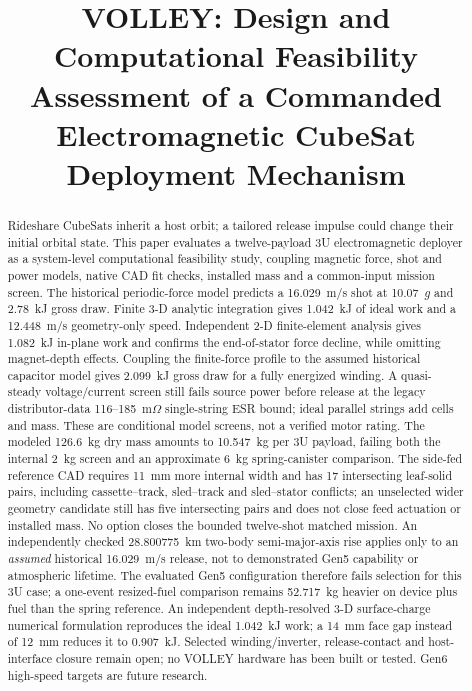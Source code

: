 \documentclass[conference]{IEEEtran}
\begin{document}
\title{VOLLEY: Design and Computational Feasibility Assessment of a Commanded Electromagnetic CubeSat Deployment Mechanism}

\author{
}

\maketitle

\begin{abstract}
Rideshare CubeSats inherit a host orbit; a tailored release impulse could change their initial orbital state. This paper evaluates a twelve-payload 3U electromagnetic deployer as a system-level computational feasibility study, coupling magnetic force, shot and power models, native CAD fit checks, installed mass and a common-input mission screen. The historical periodic-force model predicts a 16.029~m/s shot at 10.07~$g$ and 2.78~kJ gross draw. Finite 3-D analytic integration gives 1.042~kJ of ideal work and a 12.448~m/s geometry-only speed. Independent 2-D finite-element analysis gives 1.082~kJ in-plane work and confirms the end-of-stator force decline, while omitting magnet-depth effects. Coupling the finite-force profile to the assumed historical capacitor model gives 2.099~kJ gross draw for a fully energized winding. A quasi-steady voltage/current screen still fails source power before release at the legacy distributor-data 116--185~m$\Omega$ single-string ESR bound; ideal parallel strings add cells and mass. These are conditional model screens, not a verified motor rating. The modeled 126.6~kg dry mass amounts to 10.547~kg per 3U payload, failing both the internal 2~kg screen and an approximate 6~kg spring-canister comparison. The side-fed reference CAD requires 11~mm more internal width and has 17 intersecting leaf-solid pairs, including cassette--track, sled--track and sled--stator conflicts; an unselected wider geometry candidate still has five intersecting pairs and does not close feed actuation or installed mass. No option closes the bounded twelve-shot matched mission. An independently checked 28.800775~km two-body semi-major-axis rise applies only to an \emph{assumed} historical 16.029~m/s release, not to demonstrated Gen5 capability or atmospheric lifetime. The evaluated Gen5 configuration therefore fails selection for this 3U case; a one-event resized-fuel comparison remains 52.717~kg heavier on device plus fuel than the spring reference. An independent depth-resolved 3-D surface-charge numerical formulation reproduces the ideal 1.042~kJ work; a 14~mm face gap instead of 12~mm reduces it to 0.907~kJ. Selected winding/inverter, release-contact and host-interface closure remain open; no VOLLEY hardware has been built or tested. Gen6 high-speed targets are future research.
\end{abstract}
\end{document}
